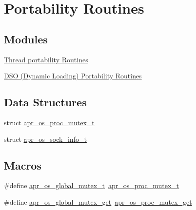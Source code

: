 \hypertarget{group__apr__portabile}{}\section{Portability Routines}
\label{group__apr__portabile}
\subsection*{Modules}
\begin{DoxyCompactItemize}
\item 
\hyperlink{group__apr__os__thread}{Thread portability Routines}
\item 
\hyperlink{group__apr__os__dso}{D\+S\+O (\+Dynamic Loading) Portability Routines}
\end{DoxyCompactItemize}
\subsection*{Data Structures}
\begin{DoxyCompactItemize}
\item 
struct \hyperlink{structapr__os__proc__mutex__t}{apr\+\_\+os\+\_\+proc\+\_\+mutex\+\_\+t}
\item 
struct \hyperlink{structapr__os__sock__info__t}{apr\+\_\+os\+\_\+sock\+\_\+info\+\_\+t}
\end{DoxyCompactItemize}
\subsection*{Macros}
\begin{DoxyCompactItemize}
\item 
\#define \hyperlink{group__apr__portabile_gadd3a9818afc16248c3c30f22e19838dd}{apr\+\_\+os\+\_\+global\+\_\+mutex\+\_\+t}~\hyperlink{structapr__os__proc__mutex__t}{apr\+\_\+os\+\_\+proc\+\_\+mutex\+\_\+t}
\item 
\#define \hyperlink{group__apr__portabile_gae9be7821e8c021915c930fc83d6d4a73}{apr\+\_\+os\+\_\+global\+\_\+mutex\+\_\+get}~\hyperlink{group__apr__portabile_ga2003a3142f05675696268053b2fddbe1}{apr\+\_\+os\+\_\+proc\+\_\+mutex\+\_\+get}
\end{DoxyCompactItemize}
